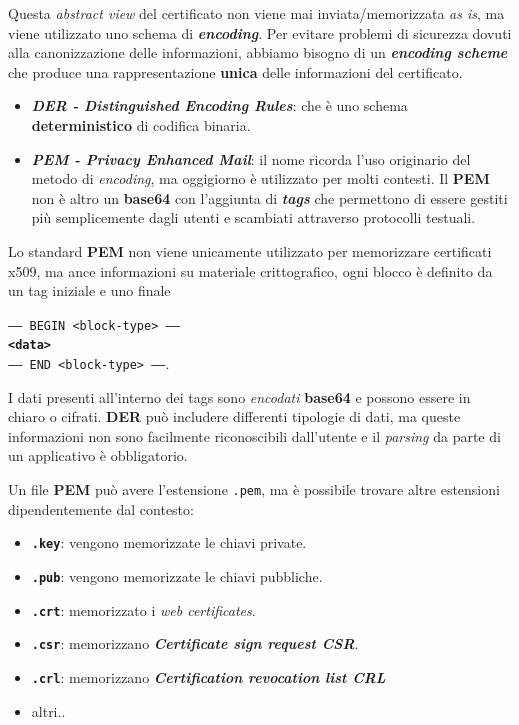 \begin{flushleft}
    Questa \textit{abstract view} del certificato non viene mai inviata/memorizzata \textit{as is}, ma viene utilizzato uno schema di \textbf{\textit{encoding}}. Per evitare problemi di sicurezza dovuti alla canonizzazione delle informazioni, abbiamo bisogno di un \textbf{\textit{encoding scheme}} che produce una rappresentazione \textbf{unica} delle informazioni del certificato.
    \begin{itemize}[nosep]
        \item \textbf{\textit{DER - Distinguished Encoding Rules}}: che è uno schema \textbf{deterministico} di codifica binaria.
        \item \textbf{\textit{PEM - Privacy Enhanced Mail}}: il nome ricorda l'uso originario del metodo di \textit{encoding}, ma oggigiorno è utilizzato per molti contesti. Il \textbf{PEM} non è altro un \textbf{base64} con l'aggiunta di \textbf{\textit{tags}} che permettono di essere gestiti più semplicemente dagli utenti e scambiati attraverso protocolli testuali.
    \end{itemize}

    Lo standard \textbf{PEM} non viene unicamente utilizzato per memorizzare certificati x509, ma ance informazioni su materiale crittografico, ogni blocco è definito da un tag iniziale e uno finale
    
    {\centering
        \texttt{----- BEGIN <block-type> -----}  \\
        \textbf{\texttt{<data>}} \\
         \texttt{----- END <block-type> ------}.
    \par}
    
    I dati presenti all'interno dei tags sono \textit{encodati} \textbf{base64} e possono essere in chiaro o cifrati. \textbf{DER} può includere differenti tipologie di dati, ma queste informazioni non sono facilmente riconoscibili dall'utente e il \textit{parsing} da parte di un applicativo è obbligatorio. 

    \medskip

    Un file \textbf{PEM} può avere l'estensione \texttt{.pem}, ma è possibile trovare altre estensioni dipendentemente dal contesto:
    \begin{itemize}[nosep]
        \item \textbf{\texttt{.key}}: vengono memorizzate le chiavi private.
        \item \textbf{\texttt{.pub}}: vengono memorizzate le chiavi pubbliche.
        \item \textbf{\texttt{.crt}}: memorizzato i \textit{web certificates}.
        \item \textbf{\texttt{.csr}}: memorizzano \textbf{\textit{Certificate sign request CSR}}.
        \item \textbf{\texttt{.crl}}: memorizzano \textbf{\textit{Certification revocation list CRL}}
        \item altri..
    \end{itemize}


\end{flushleft}
